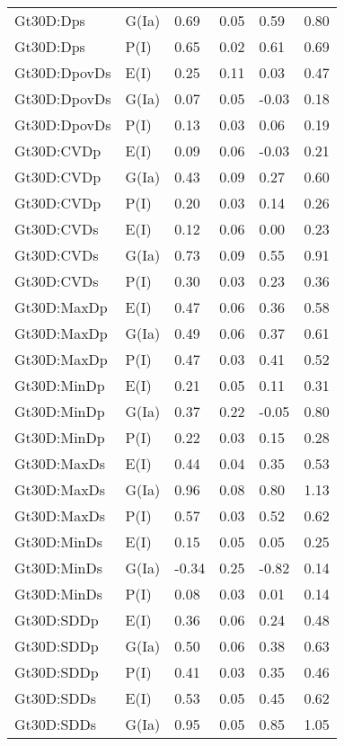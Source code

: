 \begin{center}
\begin{longtable}{|p{1.1in}|p{0.7in}|p{0.7in}|p{0.6in}|p{0.6in}|p{0.6in}|}
  Gt30D:Dps & G(Ia) & 0.69 & 0.05 & 0.59 & 0.80 \\ 
  Gt30D:Dps & P(I) & 0.65 & 0.02 & 0.61 & 0.69 \\ 
  Gt30D:DpovDs & E(I) & 0.25 & 0.11 & 0.03 & 0.47 \\ 
  Gt30D:DpovDs & G(Ia) & 0.07 & 0.05 & -0.03 & 0.18 \\ 
  Gt30D:DpovDs & P(I) & 0.13 & 0.03 & 0.06 & 0.19 \\ 
  Gt30D:CVDp & E(I) & 0.09 & 0.06 & -0.03 & 0.21 \\ 
  Gt30D:CVDp & G(Ia) & 0.43 & 0.09 & 0.27 & 0.60 \\ 
  Gt30D:CVDp & P(I) & 0.20 & 0.03 & 0.14 & 0.26 \\ 
  Gt30D:CVDs & E(I) & 0.12 & 0.06 & 0.00 & 0.23 \\ 
  Gt30D:CVDs & G(Ia) & 0.73 & 0.09 & 0.55 & 0.91 \\ 
  Gt30D:CVDs & P(I) & 0.30 & 0.03 & 0.23 & 0.36 \\ 
  Gt30D:MaxDp & E(I) & 0.47 & 0.06 & 0.36 & 0.58 \\ 
  Gt30D:MaxDp & G(Ia) & 0.49 & 0.06 & 0.37 & 0.61 \\ 
  Gt30D:MaxDp & P(I) & 0.47 & 0.03 & 0.41 & 0.52 \\ 
  Gt30D:MinDp & E(I) & 0.21 & 0.05 & 0.11 & 0.31 \\ 
  Gt30D:MinDp & G(Ia) & 0.37 & 0.22 & -0.05 & 0.80 \\ 
  Gt30D:MinDp & P(I) & 0.22 & 0.03 & 0.15 & 0.28 \\ 
  Gt30D:MaxDs & E(I) & 0.44 & 0.04 & 0.35 & 0.53 \\ 
  Gt30D:MaxDs & G(Ia) & 0.96 & 0.08 & 0.80 & 1.13 \\ 
  Gt30D:MaxDs & P(I) & 0.57 & 0.03 & 0.52 & 0.62 \\ 
  Gt30D:MinDs & E(I) & 0.15 & 0.05 & 0.05 & 0.25 \\ 
  Gt30D:MinDs & G(Ia) & -0.34 & 0.25 & -0.82 & 0.14 \\ 
  Gt30D:MinDs & P(I) & 0.08 & 0.03 & 0.01 & 0.14 \\ 
  Gt30D:SDDp & E(I) & 0.36 & 0.06 & 0.24 & 0.48 \\ 
  Gt30D:SDDp & G(Ia) & 0.50 & 0.06 & 0.38 & 0.63 \\ 
  Gt30D:SDDp & P(I) & 0.41 & 0.03 & 0.35 & 0.46 \\ 
  Gt30D:SDDs & E(I) & 0.53 & 0.05 & 0.45 & 0.62 \\ 
  Gt30D:SDDs & G(Ia) & 0.95 & 0.05 & 0.85 & 1.05 \\ 

\end{longtable}
\end{center}

